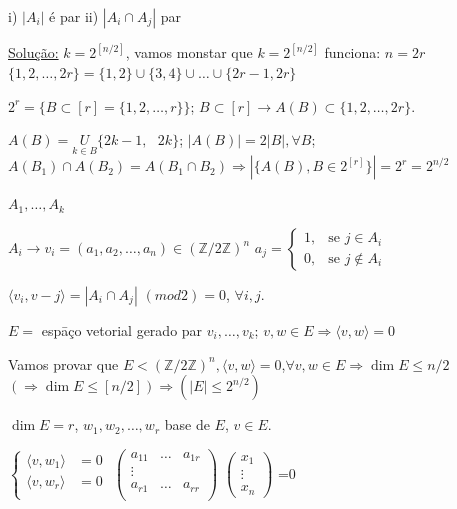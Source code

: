 \documentclass[a4paper,12pt]{article}
\theoremstyle{plain} %
\theoremstyle{definition} %
\theoremstyle{remark} %
\begin{document}
	i) $|A_i|$ \'e par \hspace{3ex} ii) $|A_i\cap A_j|$ par
	
	\begin{framed}
		\underline{Solu\c{c}\~ao:} $k=2^{[n/2]}$, vamos monstar que $k=2^{[n/2]}$ funciona: $n=2r$ $\{1, 2, \dotso, 2r\}=\{1, 2\}\cup \{3,4\}\cup \dotso \cup \{2r-1,2r\}$
		
		$2^r=\{B\subset [r]=\{1, 2, \dotso, r\}\}$; $B\subset [r]\rightarrow A(B)\subset \{1, 2, \dotso, 2r\}$.
		
		$A(B)=\underset{k\in B}{U} \{2k-1, \text{ }2k\}$; $|A(B)|=2|B|, \forall B$; $A(B_1)\cap A(B_2)=A(B_1\cap B_2)\Rightarrow |\{A(B),B\in 2^{[r]}\}|=2^r=2^{n/2}$
		
		$A_1,\dotso,A_k$
		
		$A_i\rightarrow v_i=(a_1,a_2,\dotso,a_n)\in (\mathds{Z}/2\mathds{Z})^n$ $a_j=\begin{cases}
			1, &\text{se }  j \in A_i \\
			0, &\text{se } j\not\in A_i
		\end{cases}$
		
		$\langle v_i, v-j\rangle=|A_i\cap A_j|$ $(mod2)=0$, $\forall i,j$.
		
		$E=$ esp\=a\c{c}o vetorial gerado par $v_i,\dotso,v_k$; $v,w\in E\Rightarrow \langle v,w\rangle=0$
		
		Vamos provar que $E<(\mathds{Z}/2\mathds{Z})^n, \langle v,w\rangle=0$,$\forall v,w\in E\Rightarrow \dim E\leqslant n/2$ $(\Rightarrow \dim E \leqslant [n/2])\Rightarrow (|E|\leqslant 2^{n/2})$
		
		$\dim E=r$, $w_1,w_2,\dotso,w_r$ base de $E$, $v\in E$.
		\vspace{1ex}
		
		$\left\{
		\begin{aligned}
			\langle v, w_1\rangle &=0  \\
			\langle v, w_r\rangle &=0\\
		\end{aligned}
		\right.$ \hspace{5ex} $\begin{pmatrix}
			a_{11}&\dotso&a_{1r}\\
			\vdots& & \\
			a_{r1}&\dotso&a_{rr}\\
		\end{pmatrix}$ $\begin{pmatrix} 
			x_1 \\
			\vdots\\
			x_n
		\end{pmatrix}$ =0
		

\end{framed}
\end{document}
